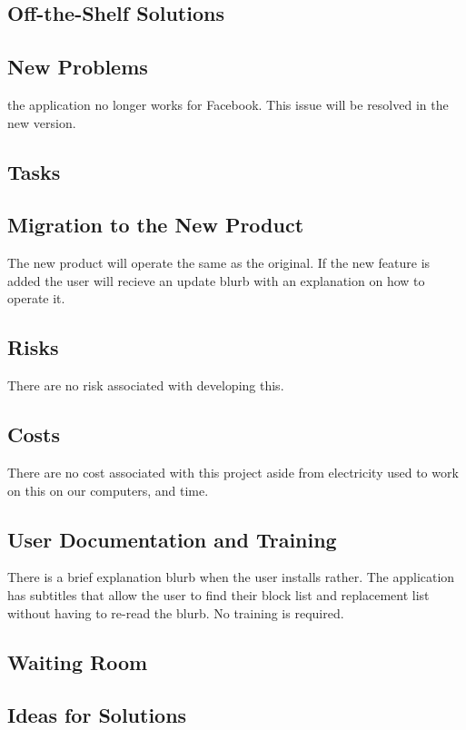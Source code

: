 \documentclass[12pt, titlepage]{article}
\begin{document}
\subsection{Off-the-Shelf Solutions}

\subsection{New Problems}
the application no longer works for Facebook. This issue will be resolved in the new version.

\subsection{Tasks}

\subsection{Migration to the New Product}
The new product will operate the same as the original. If the new feature is added the user will recieve an update blurb with an explanation on how to operate it. 

\subsection{Risks}
There are no risk associated with developing this.

\subsection{Costs}
There are no cost associated with this project aside from electricity used to work on this on our computers, and time. 

\subsection{User Documentation and Training}
There is a brief explanation blurb when the user installs rather. The application has subtitles that allow the user to find their block list and replacement list without having to re-read the blurb. No training is required.

\subsection{Waiting Room}

\subsection{Ideas for Solutions}
\end{document}
